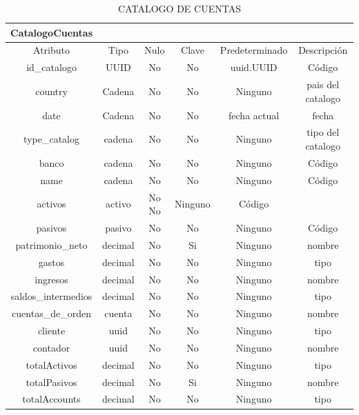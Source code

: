 \documentclass{article}
\begin{document}
\begin{table}[H]
    \centering
    \begin{tabular}{|c|c|c|c|c|c|}
    \hline
CatalogoCuentas	& & & & & \\				
\hline

Atributo&	Tipo&	Nulo&	Clave&	Predeterminado&	Descripción\\
\hline

id_catalogo&	UUID	&No&	No	&uuid.UUID	&Código\\
\hline

country	&Cadena	&No	&No	&Ninguno	&pais del catalogo\\
\hline

date&	Cadena&	No	&No	&fecha actual	&fecha\\
\hline

type_catalog&	cadena&	No	&No&	Ninguno	&tipo del catalogo\\
\hline

banco&	cadena&	No	&No	&Ninguno&	Código\\
\hline

name	&cadena	&No	&No&	Ninguno	&Código\\
\hline

activos&	activo	&No	No&	Ninguno&	Código\\
\hline

pasivos	&pasivo&	No	&No&	Ninguno	&Código\\
\hline

patrimonio_neto	&decimal&	No&	Si	&Ninguno&	nombre\\
\hline

gastos	&decimal	&No	&No&	Ninguno&	tipo\\
\hline

ingresos	&decimal	&No	&No&Ninguno&	nombre\\
\hline

saldos_intermedios&	decimal&	No	&No	&Ninguno&	tipo\\
\hline

cuentas_de_orden&	cuenta	&No	&No&	Ninguno	&nombre\\
\hline

cliente&	uuid	&No	&No&	Ninguno&	tipo\\
\hline

contador&	uuid&	No&	No&	Ninguno	&nombre\\
\hline

totalActivos&	decimal&	No	&No&	Ninguno	&tipo\\
\hline

totalPasivos	&decimal&	No&	Si&	Ninguno&	nombre\\
\hline

totalAccounts	&decimal	&No&	No	&Ninguno	&tipo\\
\hline
    \end{tabular}
    \caption{CATALOGO DE CUENTAS}
    \label{}
\end{table}

\printbibliography[
heading=bibintoc,
title={References}
]
\end{document}
